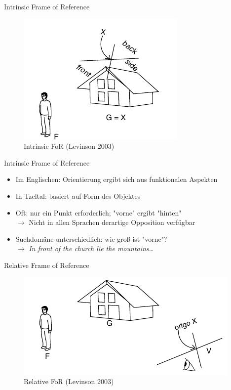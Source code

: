 \documentclass[12pt,a4paper]{beamer}
\begin{document}
\begin{frame}{Intrinsic Frame of Reference}
\begin{figure}
\includegraphics[scale=0.7]{img/levinson_FOR_intrinsic.png}
\caption{Intrinsic FoR (Levinson 2003)}
\end{figure}
\end{frame}

\begin{frame}{Intrinsic Frame of Reference}
\begin{itemize}
\item Im Englischen: Orientierung ergibt sich aus funktionalen Aspekten
\item In Tzeltal: basiert auf Form des Objektes
\item Oft: nur ein Punkt erforderlich; "vorne" ergibt "hinten" \\
$\to$ Nicht in allen Sprachen derartige Opposition verfügbar
\item Suchdomäne unterschiedlich: wie groß ist "vorne"? \\
$\to$ \textit{In front of the church lie the mountains\ldots}
\end{itemize}
\end{frame}


\begin{frame}{Relative Frame of Reference}
\begin{figure}
\includegraphics[scale=0.7]{img/levinson_FOR_relative.png}
\caption{Relative FoR (Levinson 2003)}
\end{figure}
\end{frame}
\end{document}
